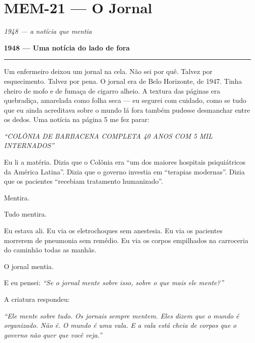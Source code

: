 \section*{\textbf{MEM-21} --- O Jornal}

\noindent \textit{1948 --- a notícia que mentia}

\noindent \textbf{1948 --- Uma notícia do lado de fora}

\vspace{0.5em}\noindent\rule{\textwidth}{0.5pt}\vspace{0.5em}

\noindent Um enfermeiro deixou um jornal na cela. Não sei por quê. Talvez por esquecimento. Talvez por pena. O jornal era de Belo Horizonte, de 1947. Tinha cheiro de mofo e de fumaça de cigarro alheio. A textura das páginas era quebradiça, amarelada como folha seca --- eu segurei com cuidado, como se tudo que eu ainda acreditava sobre o mundo lá fora também pudesse desmanchar entre os dedos. Uma notícia na página 5 me fez parar:

\noindent \textit{\textquotedblleft{}COLÔNIA DE BARBACENA COMPLETA 40 ANOS COM 5 MIL INTERNADOS\textquotedblright{}}

\noindent Eu li a matéria. Dizia que o Colônia era \textquotedblleft{}um dos maiores hospitais psiquiátricos da América Latina\textquotedblright{}. Dizia que o governo investia em \textquotedblleft{}terapias modernas\textquotedblright{}. Dizia que os pacientes \textquotedblleft{}recebiam tratamento humanizado\textquotedblright{}.

\noindent Mentira.

\noindent Tudo mentira.

\noindent Eu estava ali. Eu via os eletrochoques sem anestesia. Eu via os pacientes morrerem de pneumonia sem remédio. Eu via os corpos empilhados na carroceria do caminhão todas as manhãs.

\noindent O jornal mentia.

\noindent E eu pensei: \textit{\textquotedblleft{}Se o jornal mente sobre isso, sobre o que mais ele mente?\textquotedblright{}}

\noindent A criatura respondeu:

\noindent \textit{\textquotedblleft{}Ele mente sobre tudo. Os jornais sempre mentem. Eles dizem que o mundo é organizado. Não é. O mundo é uma vala. E a vala está cheia de corpos que o governo não quer que você veja.\textquotedblright{}}

